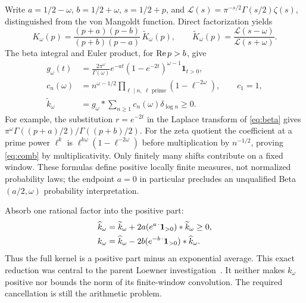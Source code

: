 Write $a=1/2-\omega$, $b=1/2+\omega$, $s=1/2+p$, and
$\mathcal L(s)=\pi^{-s/2}\Gamma(s/2)\zeta(s)$, distinguished from the
von Mangoldt function. Direct factorization yields
\begin{equation}\label{eq:factor}
 K_\omega(p)=\frac{(p+a)(p-b)}{(p+b)(p-a)}\,
 \widetilde K_\omega(p),\qquad
 \widetilde K_\omega(p)=\frac{\mathcal L(s-\omega)}{\mathcal L(s+\omega)}.
\end{equation}
The beta integral and Euler product, for $\operatorname{Re} p>b$, give
\begin{align}
 g_\omega(t)&=\frac{2\pi^\omega}{\Gamma(\omega)}
 e^{-a t}(1-e^{-2t})^{\omega-1}\mathbf1_{t>0},\label{eq:beta}\\
 c_n(\omega)&=n^{\omega-1/2}\prod_{\ell\mid n,\ \ell\text{ prime}}
 (1-\ell^{-2\omega}),\qquad c_1=1,\label{eq:comb}\\
 \widetilde k_\omega&=g_\omega*\sum_{n\geq1}c_n(\omega)\delta_{\log n}\geq0.
 \label{eq:positive-part}
\end{align}
For example, the substitution $r=e^{-2t}$ in the Laplace transform of
\eqref{eq:beta} gives
$\pi^\omega\Gamma((p+a)/2)/\Gamma((p+b)/2)$.
For the zeta quotient the coefficient at a prime power $\ell^k$ is
$\ell^{k\omega}(1-\ell^{-2\omega})$ before multiplication by
$n^{-1/2}$, proving \eqref{eq:comb} by multiplicativity.
Only finitely many shifts contribute on a fixed window. These formulas
define positive locally finite measures, not normalized probability
laws; the endpoint $a=0$ in particular precludes an unqualified
Beta$(a/2,\omega)$ probability interpretation.

Absorb one rational factor into the positive part:
\begin{align}
 \widehat k_\omega
 &=\widetilde k_\omega+2a(e^{a\,\cdot}\mathbf1_{>0})*
 \widetilde k_\omega\geq0,\notag\\
 k_\omega&=\widehat k_\omega
 -2b(e^{-b\,\cdot}\mathbf1_{>0})*\widehat k_\omega.
 \label{eq:rational-subtraction}
\end{align}
Thus the full kernel is a positive part minus an exponential average.
This exact reduction was central to the parent Loewner
investigation~\cite{ParentLoewner}. It neither makes $k_\omega$ positive
nor bounds the norm of its finite-window convolution. The required
cancellation is still the arithmetic problem.

